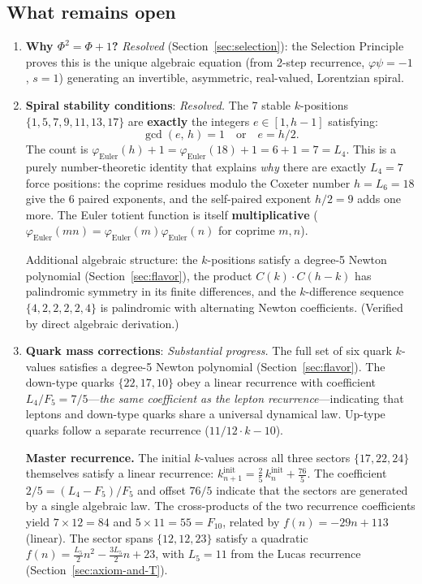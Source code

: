 \documentclass[12pt,a4paper]{article}
\begin{document}
\subsection{What remains open}

\begin{enumerate}
\item \textbf{Why $\Phi^2 = \Phi + 1$?} \emph{Resolved} (Section~\ref{sec:selection}): the Selection Principle proves this is the unique algebraic equation (from 2-step recurrence, $\varphi\psi=-1$, $s=1$) generating an invertible, asymmetric, real-valued, Lorentzian spiral.

\item \textbf{Spiral stability conditions}: \emph{Resolved.} The 7 stable $k$-positions $\{1, 5, 7, 9, 11, 13, 17\}$ are \textbf{exactly} the integers $e \in [1, h{-}1]$ satisfying:
\begin{equation}
\gcd(e,\, h) = 1 \quad\text{or}\quad e = h/2. \label{eq:stability-criterion}
\end{equation}
The count is $\varphi_{\mathrm{Euler}}(h) + 1 = \varphi_{\mathrm{Euler}}(18) + 1 = 6 + 1 = 7 = L_4$. This is a purely number-theoretic identity that explains \emph{why} there are exactly $L_4 = 7$ force positions: the coprime residues modulo the Coxeter number $h = L_6 = 18$ give the 6 paired exponents, and the self-paired exponent $h/2 = 9$ adds one more. The Euler totient function is itself \textbf{multiplicative} ($\varphi_{\mathrm{Euler}}(mn) = \varphi_{\mathrm{Euler}}(m) \varphi_{\mathrm{Euler}}(n)$ for coprime $m,n$).

Additional algebraic structure: the $k$-positions satisfy a degree-5 Newton polynomial (Section~\ref{sec:flavor}), the product $C(k) \cdot C(h{-}k)$ has palindromic symmetry in its finite differences, and the $k$-difference sequence $\{4,2,2,2,2,4\}$ is palindromic with alternating Newton coefficients. (Verified by direct algebraic derivation.)

\item \textbf{Quark mass corrections}: \emph{Substantial progress.} The full set of six quark $k$-values satisfies a degree-5 Newton polynomial (Section~\ref{sec:flavor}). The down-type quarks $\{22, 17, 10\}$ obey a linear recurrence with coefficient $L_4/F_5 = 7/5$---\emph{the same coefficient as the lepton recurrence}---indicating that leptons and down-type quarks share a universal dynamical law. Up-type quarks follow a separate recurrence ($11/12 \cdot k - 10$).

\textbf{Master recurrence.} The initial $k$-values across all three sectors $\{17, 22, 24\}$ themselves satisfy a linear recurrence: $k^{\mathrm{init}}_{n+1} = \frac{2}{5}\,k^{\mathrm{init}}_n + \frac{76}{5}$. The coefficient $2/5 = (L_4 - F_5)/F_5$ and offset $76/5$ indicate that the sectors are generated by a single algebraic law. The cross-products of the two recurrence coefficients yield $7 \times 12 = 84$ and $5 \times 11 = 55 = F_{10}$, related by $f(n) = -29n + 113$ (linear). The sector spans $\{12, 12, 23\}$ satisfy a quadratic $f(n) = \frac{L_5}{2}n^2 - \frac{3L_5}{2}n + 23$, with $L_5 = 11$ from the Lucas recurrence (Section~\ref{sec:axiom-and-T}).


\end{enumerate}
\end{document}
